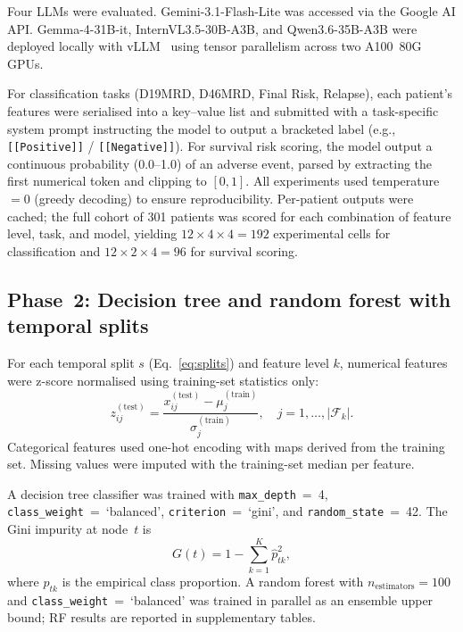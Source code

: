 \documentclass[pdflatex,sn-nature]{sn-jnl}
\begin{document}
Four LLMs were evaluated. Gemini-3.1-Flash-Lite was accessed via the
Google AI API.
Gemma-4-31B-it, InternVL3.5-30B-A3B, and Qwen3.6-35B-A3B were
deployed locally with vLLM~\cite{[CITE:vLLM]} using tensor parallelism
across two A100~80G GPUs.

For classification tasks (D19MRD, D46MRD, Final Risk, Relapse), each
patient's features were serialised into a key--value list and
submitted with a task-specific system prompt instructing the model to
output a bracketed label (e.g., \texttt{[[Positive]]} /
\texttt{[[Negative]]}).
For survival risk scoring, the model output a continuous probability
(0.0--1.0) of an adverse event, parsed by extracting the first
numerical token and clipping to $[0, 1]$.
All experiments used temperature~$= 0$ (greedy decoding) to ensure
reproducibility.
Per-patient outputs were cached; the full cohort of 301 patients was
scored for each combination of feature level, task, and model,
yielding $12 \times 4 \times 4 = 192$ experimental cells for
classification and $12 \times 2 \times 4 = 96$ for survival scoring.

\subsection{Phase~2: Decision tree and random forest with
  temporal splits}\label{sec:dt}

For each temporal split $s$ (Eq.~\ref{eq:splits}) and feature level $k$,
numerical features were z-score normalised using training-set
statistics only:
\begin{equation}
z_{ij}^{(\text{test})} =
\frac{x_{ij}^{(\text{test})} - \mu_j^{(\text{train})}}
     {\sigma_j^{(\text{train})}},
\quad j = 1, \ldots, |\mathcal{F}_k|.
\label{eq:zscore}
\end{equation}
Categorical features used one-hot encoding with maps derived from
the training set.
Missing values were imputed with the training-set median per feature.

A decision tree classifier was trained with
\texttt{max\_depth}~=~4, \texttt{class\_weight}~=~`balanced',
\texttt{criterion}~=~`gini', and \texttt{random\_state}~=~42.
The Gini impurity at node~$t$ is
\begin{equation}
G(t) = 1 - \sum_{k=1}^{K} \hat{p}_{tk}^2,
\label{eq:gini}
\end{equation}
where $\hat{p}_{tk}$ is the empirical class proportion.
A random forest with $n_{\text{estimators}}=100$ and
\texttt{class\_weight}~=~`balanced' was trained in parallel as an
ensemble upper bound; RF results are reported in supplementary tables.
\end{document}
